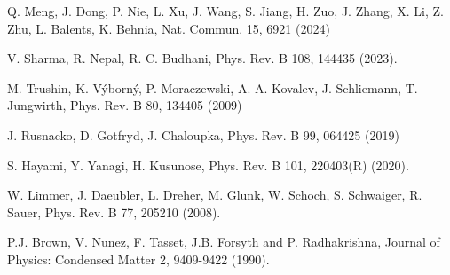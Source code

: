 \documentclass[prb,showpacs,amsmath,amssymb,superscriptaddress,twocolumn,floatfix]{revtex4-1}
\begin{document}
\begin{thebibliography}{99}
 Q. Meng, J. Dong, P. Nie, L. Xu, J. Wang, S. Jiang, H. Zuo, J. Zhang, X. Li, Z. Zhu, L. Balents, K. Behnia, Nat. Commun. 15, 6921 (2024)

 V. Sharma, R. Nepal, R. C. Budhani, Phys. Rev. B 108, 144435 (2023). %

 M. Trushin, K. V\'yborn\'y, P. Moraczewski, A. A. Kovalev, J. Schliemann, T. Jungwirth, Phys. Rev. B 80, 134405 (2009) %

 J. Rusnacko, D. Gotfryd, J. Chaloupka, Phys. Rev. B 99, 064425 (2019)

 S. Hayami, Y. Yanagi, H. Kusunose, 
Phys. Rev. B 101, 220403(R) (2020). %

 W. Limmer, J. Daeubler, L. Dreher, M. Glunk, W. Schoch, S. Schwaiger, R. Sauer, Phys. Rev. B 77, 205210 (2008). %

 P.J. Brown, V. Nunez, F. Tasset, J.B. Forsyth and P. Radhakrishna, Journal of Physics: Condensed Matter 2, 9409-9422 (1990). %








  
\end{thebibliography}
\end{document}
